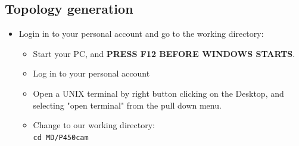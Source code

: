 \documentclass[a4paper,12pt]{article}
\begin{document}
%
%
%
%
\subsection {Topology generation}
\begin {itemize}
\item Login in to your personal account and go to the working directory:
    \begin {itemize}
    \item Start your PC, and {\bf PRESS F12 BEFORE WINDOWS STARTS}.
    \item Log in to your personal account
    \item Open a UNIX terminal by right button clicking on the Desktop, and selecting "open terminal" from the pull down menu.
    \item Change to our working directory:\\
    \texttt{cd MD/P450cam}\\
    \end {itemize}



\end{itemize}
\end{document}
